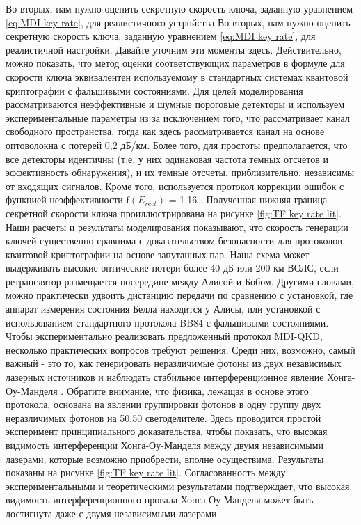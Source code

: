 \begin{figure}
\end{figure} \label{fig:key rate MDI lit}
Во-вторых, нам нужно оценить секретную скорость ключа, заданную уравнением \ref{eq:MDI key rate}, для реалистичного устройства 
Во-вторых, нам нужно оценить секретную скорость ключа, заданную уравнением \ref{eq:MDI key rate}, для реалистичной настройки. Давайте уточним эти моменты здесь. Действительно, можно показать, что метод оценки соответствующих параметров в формуле для скорости ключа эквивалентен используемому в стандартных системах квантовой криптографии с фальшивыми состояниями. Для целей моделирования рассматриваются неэффективные и шумные пороговые детекторы и используем экспериментальные параметры из \cite{takeoka2014} за исключением того, что \cite{takeoka2014} рассматривает канал свободного пространства, тогда как здесь рассматривается канал на основе оптоволокна с потерей 0,2 дБ/км. Более того, для простоты предполагается, что все детекторы идентичны (т.е. у них одинаковая частота темных отсчетов и эффективность обнаружения), и их темные отсчеты, приблизительно, независимы от входящих сигналов. Кроме того, используется протокол коррекции ошибок с функцией неэффективности $\text{f}(E_{rect})$ = 1,16 \cite{pirandola2017}. Полученная нижняя граница секретной скорости ключа проиллюстрирована на рисунке \ref{fig:TF key rate lit}. Наши расчеты и результаты моделирования показывают, что скорость генерации ключей существенно сравнима с доказательством безопасности \cite{ma2007} для протоколов квантовой криптографии на основе запутанных пар. Наша схема может выдерживать высокие оптические потери более 40 дБ или 200 км ВОЛС, если ретранслятор размещается посередине между Алисой и Бобом. Другими словами, можно практически удвоить дистанцию передачи по сравнению с установкой, где аппарат измерения состояния Белла находится у Алисы, или установкой с использованием стандартного протокола BB84 с фальшивыми состояниями.
Чтобы экспериментально реализовать предложенный протокол MDI-QKD, несколько практических вопросов требуют решения. Среди них, возможно, самый важный - это то, как генерировать неразличимые фотоны из двух независимых лазерных источников и наблюдать стабильное интерференционное явление Хонга-Оу-Манделя \cite{hong1987}. Обратите внимание, что физика, лежащая в основе этого протокола, основана на явлении группировки фотонов в одну группу двух неразличимых фотонов на 50:50 светоделителе. Здесь проводится простой эксперимент принципиального доказательства, чтобы показать, что высокая видимость интерференции Хонга-Оу-Манделя между двумя независимыми лазерами, которые возможно приобрести, вполне осуществима. Результаты показаны на рисунке \ref{fig:TF key rate lit}. Согласованность между экспериментальными и теоретическими результатами подтверждает, что высокая видимость интерференционного провала Хонга-Оу-Манделя может быть достигнута даже с двумя независимыми лазерами.
